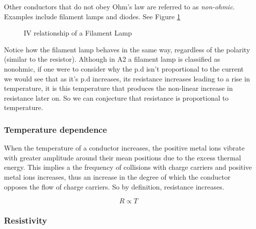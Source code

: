 Other conductors that do not obey Ohm's law are referred to as \textit{non-ohmic}. Examples include filament lamps and diodes. See Figure \ref{fig:IV-Filament-Lamp}

\begin{figure}[h!]
    \centering
    \caption{IV relationship of a Filament Lamp}
    \label{fig:IV-Filament-Lamp}
\end{figure}
\FloatBarrier

Notice how the filament lamp behaves in the same way, regardless of the polarity (similar to the resistor). Although in A2 a filament lamp is classified as nonohmic, if one were to consider why the p.d isn't proportional to the current we would see that as it's p.d increases, its resistance increases leading to a rise in temperature, it is this temperature that produces the non-linear increase in resistance later on. So we can conjecture that resistance is proportional to temperature.

\subsubsection{Temperature dependence}

When the temperature of a conductor increases, the positive metal ions vibrate with greater amplitude around their mean positions due to the excess thermal energy. This implies a the frequency of collisions with charge carriers and positive metal ions increases, thus an increase in the degree of which the conductor opposes the flow of charge carriers. So by definition, resistance increases.

\begin{equation}
    R \propto T
\end{equation}


\subsubsection{Resistivity}

